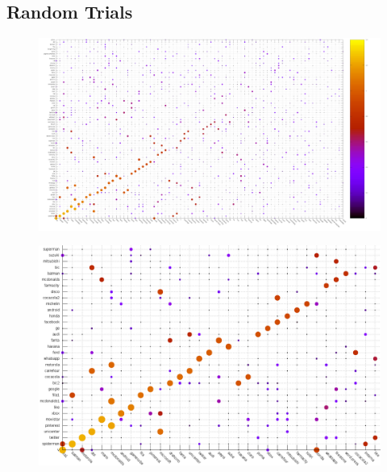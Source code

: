 \documentclass{beamer}
\begin{document}
\subsection{Random Trials}

\begin{frame}
\begin{figure}[h]
 \centering
  \begin{minipage}[c]{1\textwidth}
	\centering	
	\includegraphics[scale=0.13]{random.png}
  \end{minipage}
\end{figure}
\end{frame}

\begin{frame}
\begin{figure}[h]
 \centering
  \begin{minipage}[c]{1\textwidth}
	\centering	
	\includegraphics[scale=0.32]{randomx.png}
  \end{minipage}
\end{figure}
\end{frame}
\end{document}
